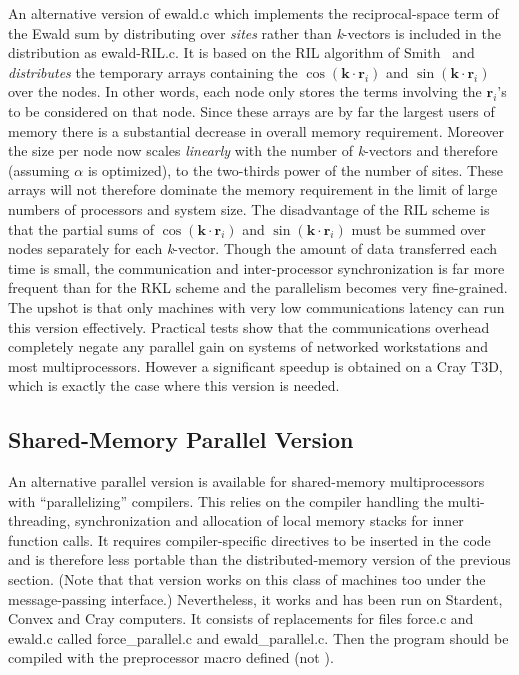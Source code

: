 \documentclass[a4paper,twoside]{report}
\newcommand{\Fname}[1]{{\upshape\mdseries\sffamily#1}}
\newcommand{\bm}[1]{\mathbf{#1}}
\begin{document}
An alternative version of \Fname{ewald.c} which implements the
reciprocal-space term of the Ewald sum by distributing over
\emph{sites} rather than \emph{k}-vectors is included in the
distribution as \Fname{ewald-RIL.c}.  It is based on the RIL algorithm
of Smith~\cite{smith:92} and \emph{distributes} the temporary arrays
containing the $\cos(\bm{k} \cdot \bm{r}_i)$ and $\sin(\bm{k} \cdot
\bm{r}_i)$ over the nodes. In other words, each node only stores the
terms involving the $\bm{r}_i$'s to be considered on that node.  Since
these arrays are by far the largest users of memory there is a
substantial decrease in overall memory requirement.  Moreover the size
per node now scales \emph{linearly} with the number of
\emph{k}-vectors and therefore (assuming $\alpha$ is optimized), to
the two-thirds power of the number of sites.  These arrays will not
therefore dominate the memory requirement in the limit of large
numbers of processors and system size.  The disadvantage of the RIL
scheme is that the partial sums of $\cos(\bm{k} \cdot \bm{r}_i)$ and
$\sin(\bm{k} \cdot \bm{r}_i)$ must be summed over nodes separately for
each \emph{k}-vector. Though the amount of data transferred each time
is small, the communication and inter-processor synchronization is far
more frequent than for the RKL scheme and the parallelism becomes very
fine-grained.  The upshot is that only machines with very low
communications latency can run this version effectively.  Practical
tests show that the communications overhead completely negate any
parallel gain on systems of networked workstations and most
multiprocessors.  However a significant speedup is obtained on a Cray
T3D, which is exactly the case where this version is needed.

\subsection{Shared-Memory Parallel Version}
\label{sec:shmpar}
An alternative parallel version is available for shared-memory
multiprocessors with ``parallelizing'' compilers.  This relies on the
compiler handling the multi-threading, synchronization and allocation
of local memory stacks for inner function calls. It requires
compiler-specific directives to be inserted in the code and is
therefore less portable than the distributed-memory version of the
previous section. (Note that that version works on this class of
machines too under the message-passing interface.) Nevertheless, it
works and has been run on Stardent, Convex and Cray computers.  It
consists of replacements for files \Fname{force.c} and
\Fname{ewald.c} called \Fname{force\_parallel.c} and
\Fname{ewald\_parallel.c}. Then the program should be compiled with
the preprocessor macro  defined (not ).
\end{document}
